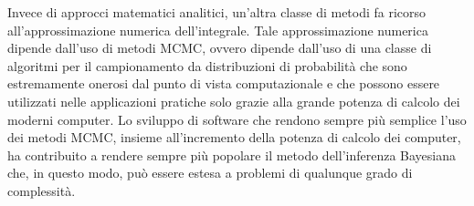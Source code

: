 Invece di approcci matematici analitici, un'altra classe di metodi fa ricorso all'approssimazione numerica dell'integrale. 
Tale approssimazione numerica dipende dall'uso di metodi MCMC, ovvero dipende dall'uso di una classe di algoritmi per il campionamento da distribuzioni di probabilità che sono estremamente onerosi dal punto di vista computazionale e che possono essere utilizzati nelle applicazioni pratiche solo grazie alla grande potenza di calcolo dei moderni computer. 
Lo sviluppo di software che rendono sempre più semplice l'uso dei metodi MCMC, insieme all'incremento della potenza di calcolo dei computer, ha contribuito a rendere sempre più popolare il metodo dell'inferenza Bayesiana che, in questo modo, può essere estesa a problemi di qualunque grado di complessità.



 